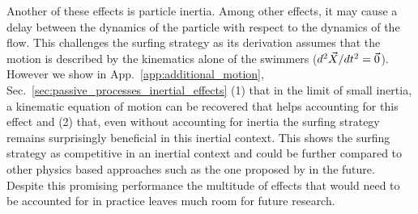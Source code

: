 Another of these effects is particle inertia.
Among other effects, it may cause a delay between the dynamics of the particle with respect to the dynamics of the flow.
This challenges the surfing strategy as its derivation assumes that the motion is described by the kinematics alone of the swimmers ($d^2 \vec{X} / dt^2 = \vec{0}$).
However we show in App.~\ref{app:additional_motion}, Sec.~\ref{sec:passive_processes_inertial_effects} (1) that in the limit of small inertia, a kinematic equation of motion can be recovered that helps accounting for this effect and (2) that, even without accounting for inertia the surfing strategy remains surprisingly beneficial in this inertial context.
This shows the surfing strategy as competitive in an inertial context and could be further compared to other physics based approaches such as the one proposed by \citet{bollt2021extract} in the future.
Despite this promising performance the multitude of effects that would need to be accounted for in practice leaves much room for future research.
